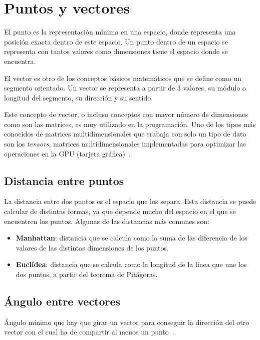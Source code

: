 \section{Puntos y vectores}
El punto es la representación mínima en una espacio, donde representa una posición exacta dentro de este espacio. Un punto dentro de un espacio se representa con tantos valores como dimensiones tiene el espacio donde se encuentra.

El vector es otro de los conceptos básicos matemáticos que se define como un segmento orientado. Un vector se representa a partir de 3 valores, su módulo o longitud del segmento, su dirección y su sentido.

Este concepto de vector, o incluso conceptos con mayor número de dimensiones como son las matrices, es muy utilizado en la programación. Uno de los tipos más conocidos de matrices multidimensionales que trabaja con solo un tipo de dato son los \textit{tensors}, matrices multidimensionales implementadas para optimizar las operaciones en la GPU (tarjeta gráfica)~\cite{tensor}. 

\subsection{Distancia entre puntos}
La distancia entre dos puntos es el espacio que los separa. Esta distancia se puede calcular de distintas formas, ya que depende mucho del espacio en el que se encuentren los puntos. Algunas de las distancias más comunes son:
\begin{itemize}
	\item \textbf{Manhattan}: distancia que se calcula como la suma de las diferencia de los valores de las distintas dimensiones de los puntos.
	\item \textbf{Euclídea}: distancia que se calcula como la longitud de la línea que une los dos puntos, a partir del teorema de Pitágoras.
\end{itemize}

\subsection{Ángulo entre vectores}
Ángulo mínimo que hay que girar un vector para conseguir la dirección del otro vector con el cual ha de compartir al menos un punto~\cite{angvec}.
